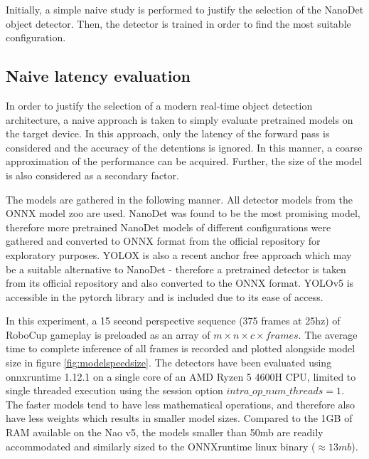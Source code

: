\documentclass[a4paper,twoside,12pt]{report}
\begin{document}
Initially, a simple naive study is performed to justify the selection of the NanoDet object detector. Then, the detector is trained in order to find the most suitable configuration.

\subsection{Naive latency evaluation}
In order to justify the selection of a modern real-time object detection architecture, a naive approach is taken to simply evaluate pretrained models on the target device. In this approach, only the latency of the forward pass is considered and the accuracy of the detentions is ignored. In this manner, a coarse approximation of the performance can be acquired. Further, the size of the model is also considered as a secondary factor.

The models are gathered in the following manner. All detector models from the ONNX model zoo \cite{modelzoo} are used. NanoDet was found to be the most promising model, therefore more pretrained NanoDet models of different configurations were gathered and converted to ONNX format from the official repository for exploratory purposes. YOLOX \citep{yolox} is also a recent anchor free approach which may be a suitable alternative to NanoDet - therefore a pretrained detector is taken from its official repository \citep{yoloxrepo} and also converted to the ONNX format. YOLOv5 is accessible in the pytorch library and is included due to its ease of access. 

In this experiment, a 15 second perspective sequence (375 frames at 25hz) of RoboCup gameplay is preloaded as an array of $m \times n \times c \times frames$. The average time to complete inference of all frames is recorded and plotted alongside model size in figure \ref{fig:modelspeedsize}. The detectors have been evaluated using onnxruntime 1.12.1 on a single core of an AMD Ryzen 5 4600H CPU, limited to single threaded execution using the session option $intra\_op\_num\_threads = 1$. The faster models tend to have less mathematical operations, and therefore also have less weights which results in smaller model sizes. Compared to the 1GB of RAM available on the Nao v5, the models smaller than 50mb are readily accommodated and similarly sized to the ONNXruntime linux binary ($\approx13mb$).
\end{document}

